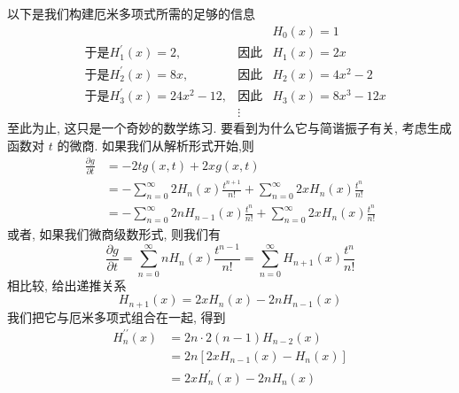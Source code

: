 \documentclass[lang=cn,newtx,10pt,scheme=chinese,thmcnt=section]{elegantbook}
\begin{document}
以下是我们构建厄米多项式所需的足够的信息
\begin{equation}
	\begin{aligned}
		&&&{H}_{0}\left( x\right) = 1\\
		&\text{于是}{H}_{1}^{\prime }\left( x\right) = 2,&\text{因此}&{H}_{1}\left( x\right) = {2x}\\
		&\text{于是}{H}_{2}^{\prime }\left( x\right) = {8x},&\text{因此}&{H}_{2}\left( x\right) = 4{x}^{2} - 2\\
		&\text{于是}{H}_{3}^{\prime }\left( x\right) = {24}{x}^{2} - {12},&\text{因此}&{H}_{3}\left( x\right) = 8{x}^{3} - {12x}\\
		&&\vdots&
	\end{aligned}
\end{equation}
至此为止, 这只是一个奇妙的数学练习. 要看到为什么它与简谐振子有关, 考虑生成函数对 $t$ 的微商. 如果我们从解析形式开始,则
\begin{equation}
	\begin{aligned}
		\frac{\partial g}{\partial t} &= - {2tg}\left( {x, t}\right) + {2xg}\left( {x, t}\right)\\
		&= - \mathop{\sum }\limits_{{n = 0}}^{\infty }2{H}_{n}\left( x\right) \frac{{t}^{n + 1}}{n!} + \mathop{\sum }\limits_{{n = 0}}^{\infty }{2x}{H}_{n}\left( x\right) \frac{{t}^{n}}{n!}\\
		&= - \mathop{\sum }\limits_{{n = 0}}^{\infty }{2n}{H}_{n - 1}\left( x\right) \frac{{t}^{n}}{n!} + \mathop{\sum }\limits_{{n = 0}}^{\infty }{2x}{H}_{n}\left( x\right) \frac{{t}^{n}}{n!}
	\end{aligned}
\end{equation}
或者, 如果我们微商级数形式, 则我们有
\begin{equation}
	\frac{\partial g}{\partial t} = \mathop{\sum }\limits_{{n = 0}}^{\infty }n{H}_{n}\left( x\right) \frac{{t}^{n - 1}}{n!} = \mathop{\sum }\limits_{{n = 0}}^{\infty }{H}_{n + 1}\left( x\right) \frac{{t}^{n}}{n!}
\end{equation}
相比较, 给出递推关系
\begin{equation}
	{H}_{n + 1}\left( x\right) = {2x}{H}_{n}\left( x\right) - {2n}{H}_{n - 1}\left( x\right)
\end{equation}
我们把它与厄米多项式组合在一起, 得到
\begin{equation}
	\begin{aligned}
		{H}^{\prime \prime }_{n}\left( x\right) &= {2n} \cdot 2\left( {n - 1}\right) {H}_{n - 2}\left( x\right)\\
		&= {2n}\left\lbrack {{2x}{H}_{n - 1}\left( x\right) - {H}_{n}\left( x\right) }\right\rbrack\\
		&= {2x}{H}_{n}^{\prime }\left( x\right) - {2n}{H}_{n}\left( x\right)
	\end{aligned}
\end{equation}
\end{document}
